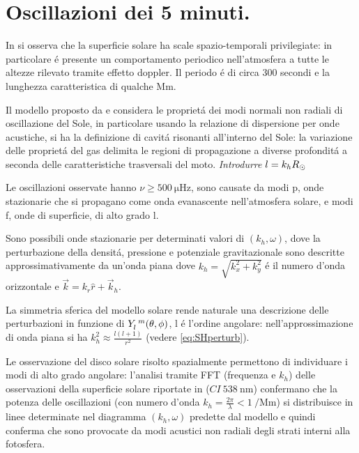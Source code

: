 \documentclass[../main.tex]{subfiles}
\begin{document}
\section{Oscillazioni dei 5 minuti.}

In \citet{lei62velocity} si osserva che la superficie solare ha scale spazio-temporali privilegiate: in particolare \'e presente un comportamento periodico nell'atmosfera a tutte le altezze rilevato tramite effetto doppler. Il periodo \'e di circa 300 secondi e la lunghezza caratteristica di qualche \si{\mega\meter}.

Il modello proposto da \citet{ulrich70five} e \citet*{stein71five} considera le propriet\'a dei modi normali non radiali di oscillazione del Sole, in particolare usando la relazione di dispersione per onde acustiche, si ha la definizione di cavit\'a risonanti all'interno del Sole: la variazione delle propriet\'a del gas delimita le regioni di propagazione a diverse profondit\'a a seconda delle caratteristiche trasversali del moto.
{\itshape Introdurre $l=k_hR_{\odot}{}$}

Le oscillazioni osservate hanno $\nu\geq\SI{500}{\micro\hertz}$, sono causate da modi p, onde stazionarie che si propagano come onda evanascente nell'atmosfera solare, e modi f, onde di superficie, di alto grado l.

Sono possibili onde stazionarie per determinati valori di  $(k_h,\omega)$, dove la perturbazione della densit\'a, pressione e potenziale gravitazionale sono descritte approssimativamente da un'onda piana dove $k_h=\sqrt{k_x^2+k_y^2}$ \'e il numero d'onda orizzontale e $\vec{k}=k_r\hat{r}+\vec{k}_h$.

La simmetria sferica del modello solare rende naturale una descrizione delle perturbazioni in funzione di $Y\indices{_l^m}(\theta,\phi)$, l \'e l'ordine angolare: nell'approssimazione di onda piana si ha $k_h^2\approx\frac{l(l+1)}{r^2}$ (vedere \eqref{eq:SHperturb}).

Le osservazione del disco solare risolto spazialmente permettono di individuare i modi di alto grado angolare: l'analisi tramite FFT (frequenza e $k_h$) delle osservazioni della superficie solare riportate in \citet{deu75observations} ($CI\ \SI{538}{\nano\meter}$) confermano che la  potenza delle oscillazioni (con numero d'onda $k_h=\frac{2\pi}{\lambda}<\SI{1}{\per\mega\meter}$) si distribuisce in linee determinate nel diagramma $(k_h,\omega)$ predette dal modello e quindi conferma che sono provocate da modi acustici non radiali degli strati interni alla fotosfera.
\end{document}
